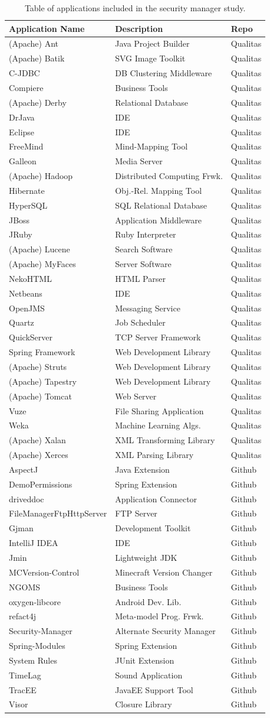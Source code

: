 \documentclass{sig-alternate}
\begin{document}
\begin{table}
\caption{Table of applications included in the security manager study.}
\label{Table:applications-studied}


\centering{}%
\begin{tabular}{lll}
\toprule 
Application Name & Description & Repo\tabularnewline
\midrule
(Apache) Ant & Java Project Builder & Qualitas\tabularnewline
(Apache) Batik & SVG Image Toolkit & Qualitas\tabularnewline
C-JDBC & DB Clustering Middleware & Qualitas\tabularnewline
Compiere & Business Tools & Qualitas\tabularnewline
(Apache) Derby & Relational Database & Qualitas\tabularnewline
DrJava & IDE & Qualitas\tabularnewline
Eclipse  & IDE & Qualitas\tabularnewline
FreeMind & Mind-Mapping Tool & Qualitas\tabularnewline
Galleon & Media Server & Qualitas\tabularnewline
(Apache) Hadoop & Distributed Computing Frwk. & Qualitas\tabularnewline
Hibernate & Obj.-Rel. Mapping Tool & Qualitas\tabularnewline
HyperSQL & SQL Relational Database & Qualitas\tabularnewline
JBoss & Application Middleware & Qualitas\tabularnewline
JRuby & Ruby Interpreter & Qualitas\tabularnewline
(Apache) Lucene & Search Software & Qualitas\tabularnewline
(Apache) MyFaces & Server Software & Qualitas\tabularnewline
NekoHTML & HTML Parser & Qualitas\tabularnewline
Netbeans & IDE & Qualitas\tabularnewline
OpenJMS & Messaging Service & Qualitas\tabularnewline
Quartz  & Job Scheduler & Qualitas\tabularnewline
QuickServer & TCP Server Framework & Qualitas\tabularnewline
Spring Framework & Web Development Library & Qualitas\tabularnewline
(Apache) Struts & Web Development Library & Qualitas\tabularnewline
(Apache) Tapestry & Web Development Library & Qualitas\tabularnewline
(Apache) Tomcat & Web Server & Qualitas\tabularnewline
Vuze & File Sharing Application & Qualitas\tabularnewline
Weka & Machine Learning Algs. & Qualitas\tabularnewline
(Apache) Xalan & XML Transforming Library & Qualitas\tabularnewline
(Apache) Xerces & XML Parsing Library & Qualitas\tabularnewline
AspectJ & Java Extension & Github\tabularnewline
DemoPermissions & Spring Extension & Github\tabularnewline
driveddoc & Application Connector & Github\tabularnewline
FileManagerFtpHttpServer & FTP Server & Github\tabularnewline
Gjman & Development Toolkit & Github\tabularnewline
IntelliJ IDEA & IDE & Github\tabularnewline
Jmin & Lightweight JDK & Github\tabularnewline
MCVersion-Control & Minecraft Version Changer & Github\tabularnewline
NGOMS & Business Tools & Github\tabularnewline
oxygen-libcore & Android Dev. Lib. & Github\tabularnewline
refact4j & Meta-model Prog. Frwk. & Github\tabularnewline
Security-Manager & Alternate Security Manager & Github\tabularnewline
Spring-Modules & Spring Extension & Github\tabularnewline
System Rules & JUnit Extension & Github\tabularnewline
TimeLag & Sound Application & Github\tabularnewline
TracEE & JavaEE Support Tool & Github\tabularnewline
Visor & Closure Library & Github\tabularnewline
\bottomrule
\end{tabular}
\end{table}
\end{document}
